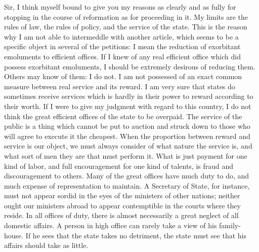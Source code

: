 Sir, I think myself bound to give you my reasons as clearly and as fully for stopping in the course of reformation as for proceeding in it. My limits are the rules of law, the rules of policy, and the service of the state. This is the reason why I am not able to intermeddle with another article, which seems to be a specific object in several of the petitions: I mean the reduction of exorbitant emoluments to efficient offices. If I knew of any real efficient office which did possess exorbitant emoluments, I should be extremely desirous of reducing them. Others may know of them: I do not. I am not possessed of an exact common measure between real service and its reward. I am very sure that states do sometimes receive services which is hardly in their power to reward according to their worth. If I were to give my judgment with regard to this country, I do not think the great efficient offices of the state to be overpaid. The service of the public is a thing which cannot be put to auction and struck down to those who will agree to execute it the cheapest. When the proportion between reward and service is our object, we must always consider of what nature the service is, and what sort of men they are that must perform it. What is just payment for one kind of labor, and full encouragement for one kind of talents, is fraud and discouragement to others. Many of the great offices have much duty to do, and much expense of representation to maintain. A Secretary of State, for instance, must not appear sordid in the eyes of the ministers of other nations; neither ought our ministers abroad to appear contemptible in the courts where they reside. In all offices of duty, there is almost necessarily a great neglect of all domestic affairs. A person in high office can rarely take a view of his family-house. If he sees that the state takes no detriment, the state must see that his affairs should take as little.

